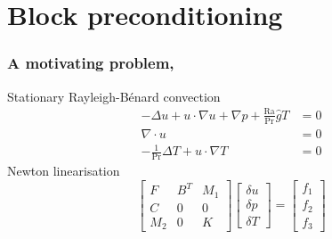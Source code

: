 \documentclass[presentation,aspectratio=43]{beamer}
\begin{document}
\section{Block preconditioning}
\begin{frame}
  \frametitle{A motivating problem,}
  \begin{block}{Stationary Rayleigh-B\'enard convection}
    \begin{equation*}
      \begin{split}
        -\Delta u + u\cdot\nabla u + \nabla p +
        \frac{\text{Ra}}{\text{Pr}} \hat{g}T &= 0 \\
        \nabla \cdot u &= 0 \\
        - \frac{1}{\text{Pr}} \Delta T + u\cdot \nabla T &= 0
      \end{split}
    \end{equation*}
    Newton linearisation
    \begin{equation*}
      \begin{bmatrix}
        F   & B^T & M_1 \\
        C   & 0   & 0   \\
        M_2 & 0 & K
      \end{bmatrix}
      \begin{bmatrix}
        \delta u \\
        \delta p \\
        \delta T
      \end{bmatrix} =
      \begin{bmatrix}
        f_1 \\
        f_2 \\
        f_3
      \end{bmatrix}
    \end{equation*}
  \end{block}
\end{frame}
\end{document}
